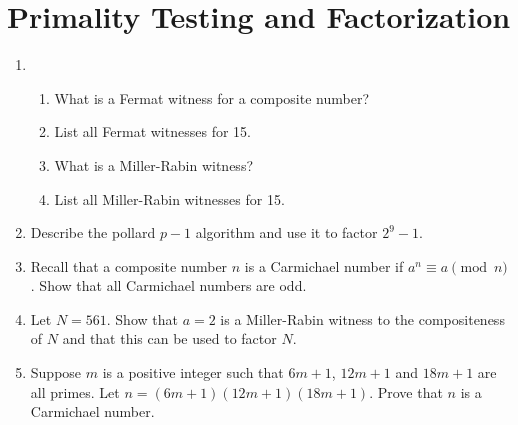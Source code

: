 \documentclass[11pt,letterpaper]{article}
\begin{document}
\section{Primality Testing and Factorization}

\begin{enumerate}
    \item \begin{enumerate}
        \item What is a Fermat witness for a composite number?

        \item List all Fermat witnesses for 15.

        \item What is a Miller-Rabin witness?

        \item List all Miller-Rabin witnesses for 15.
    \end{enumerate}

    \item Describe the pollard $p-1$ algorithm and use it to factor $2^9-1$.

    \item Recall that a composite number $n$ is a Carmichael number if $a^n\equiv a \pmod n$.
    Show that all Carmichael numbers are odd.

    \item Let $N = 561$. Show that $a=2$ is a Miller-Rabin witness to the compositeness of $N$ and that this can be used to factor $N$.

    \item Suppose $m$ is a positive integer such that $6m+1$, $12m+1$ and $18m+1$ are all primes.
    Let $n = (6m+1)(12m+1)(18m+1)$.
    Prove that $n$ is a Carmichael number.


\end{enumerate}
\end{document}
